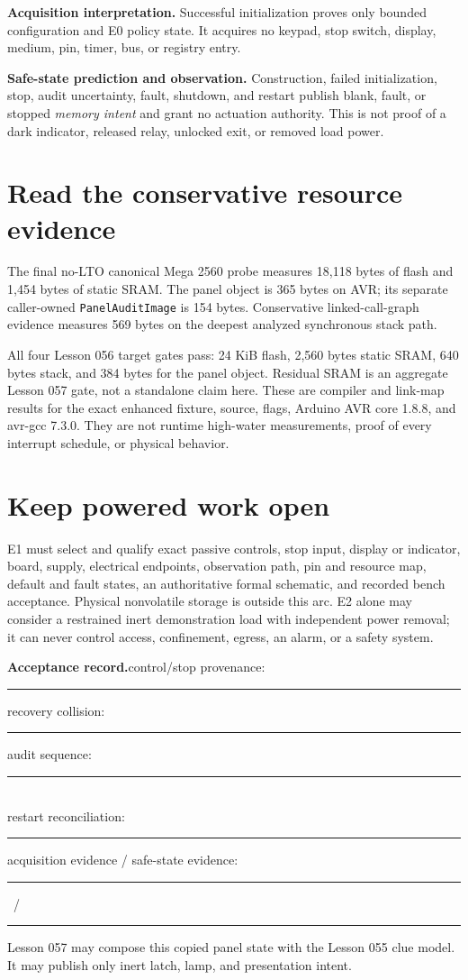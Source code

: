 \documentclass[10pt]{article}
\newcommand{\blankline}{\rule{0.72in}{0.4pt}}
\begin{document}
\textbf{Acquisition interpretation.} Successful initialization proves only
bounded configuration and E0 policy state. It acquires no keypad, stop switch,
display, medium, pin, timer, bus, or registry entry.

\textbf{Safe-state prediction and observation.} Construction, failed
initialization, stop, audit uncertainty, fault, shutdown, and restart publish
blank, fault, or stopped \emph{memory intent} and grant no actuation authority.
This is not proof of a dark indicator, released relay, unlocked exit, or
removed load power.

\section{Read the conservative resource evidence}
The final no-LTO canonical Mega 2560 probe measures 18,118 bytes of flash and
1,454 bytes of static SRAM. The panel object is 365 bytes on AVR; its separate
caller-owned \texttt{PanelAuditImage} is 154 bytes.
Conservative linked-call-graph evidence measures 569 bytes on the deepest
analyzed synchronous stack path.

All four Lesson 056 target gates pass: 24 KiB flash, 2,560 bytes static SRAM,
640 bytes stack, and 384 bytes for the panel object. Residual SRAM is an
aggregate Lesson 057 gate, not a standalone claim here. These are compiler
and link-map results for the exact enhanced fixture, source, flags, Arduino
AVR core 1.8.8, and avr-gcc 7.3.0. They are not runtime high-water
measurements, proof of every interrupt schedule, or physical behavior.

\section{Keep powered work open}
E1 must select and qualify exact passive controls, stop input, display or
indicator, board, supply, electrical endpoints, observation path, pin and
resource map, default and fault states, an authoritative formal schematic,
and recorded bench acceptance. Physical nonvolatile storage is outside this
arc. E2 alone may consider a restrained inert demonstration load with
independent power removal; it can never control access, confinement, egress,
an alarm, or a safety system.

\textbf{Acceptance record.}\quad control/stop provenance: \blankline\quad
recovery collision: \blankline\quad audit sequence: \blankline\\
restart reconciliation: \blankline\quad
acquisition evidence / safe-state evidence: \blankline\ /\ \blankline

Lesson 057 may compose this copied panel state with the Lesson 055 clue model.
It may publish only inert latch, lamp, and presentation intent.
\end{document}
